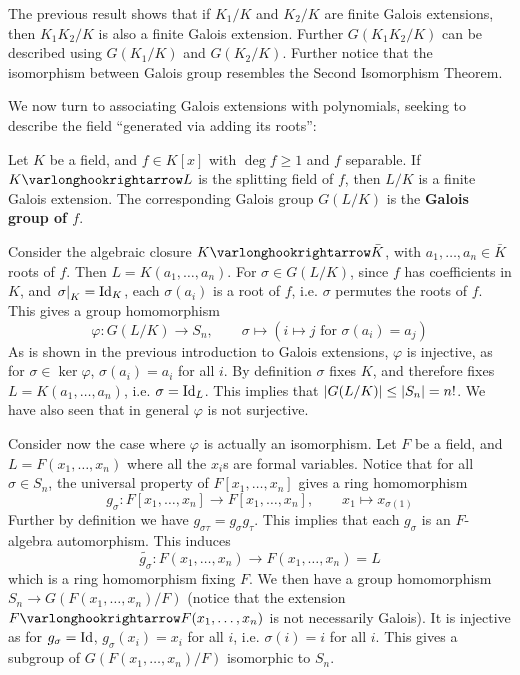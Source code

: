 \documentclass{article}
\begin{document}
\begin{remark}
    The previous result shows that if $K_1/K$ and $K_2/K$ are finite Galois extensions, then $K_1 K_2/K$ is also a finite Galois extension. Further $G(K_1 K_2/K)$ can be described using $G(K_1/K)$ and $G(K_2/K)$. Further notice that the isomorphism between Galois group resembles the Second Isomorphism Theorem.
\end{remark}

\textstart
We now turn to associating Galois extensions with polynomials, seeking to describe the field ``generated via adding its roots'':

\begin{definition}
    Let $K$ be a field, and $f \in K[x]$ with $\deg f \geq 1$ and $f$ separable. If $K \ext L$ is the splitting field of $f$, then $L/K$ is a finite Galois extension. The corresponding Galois group $G(L/K)$ is the \textbf{Galois group of $f$}.
\end{definition}

\textstart
\label{goto: order of galois group bounded by order of Sn}
Consider the algebraic closure $K \ext \bar{K}$, with $a_1, \dots, a_n \in \bar{K}$ roots of $f$. Then $L = K(a_1, \dots, a_n)$. For $\sigma \in G(L/K)$, since $f$ has coefficients in $K$, and $\left.\sigma\right|_{K} = \mathrm{Id}_K$, each $\sigma(a_i)$ is a root of $f$, i.e. $\sigma$ permutes the roots of $f$. This gives a group homomorphism
\[
    \varphi: G(L/K) \to S_n, \qquad \sigma \mapsto (i \mapsto j \text{ for $\sigma(a_i) = a_j$})
\]
As is shown in the previous introduction to Galois extensions, $\varphi$ is injective, as for $\sigma \in \ker \varphi$, $\sigma(a_i) = a_i$ for all $i$. By definition $\sigma$ fixes $K$, and therefore fixes $L = K(a_1, \dots, a_n)$, i.e. $\sigma = \mathrm{Id}_L$. This implies that $\left|G(L/K)\right| \leq \left|S_n\right| = n!$. We have also seen that in general $\varphi$ is not surjective.

Consider now the case where $\varphi$ is actually an isomorphism. Let $F$ be a field, and $L = F(x_1, \dots, x_n)$ where all the $x_i$s are formal variables. Notice that for all $\sigma \in S_n$, the universal property of $F[x_1, \dots, x_n]$ gives a ring homomorphism
\[
    g_{\sigma}: F[x_1, \dots, x_n] \to F[x_1, \dots, x_n], \qquad x_1 \mapsto x_{\sigma(1)}
\]
Further by definition we have $g_{\sigma\tau} = g_{\sigma} g_{\tau}$. This implies that each $g_{\sigma}$ is an $F$-algebra automorphism. This induces 
\[
    \widetilde{g_{\sigma}}: F(x_1, \dots, x_n) \to F(x_1, \dots, x_n) = L
\]
which is a ring homomorphism fixing $F$. We then have a group homomorphism $S_n \to G(F(x_1, \dots, x_n)/F)$ (notice that the extension $F \ext F(x_1, \dots, x_n)$ is not necessarily Galois). It is injective as for $g_{\sigma} = \mathrm{Id}$, $g_{\sigma}(x_i) = x_i$ for all $i$, i.e. $\sigma(i) = i$ for all $i$. This gives a subgroup of $G(F(x_1, \dots, x_n)/F)$ isomorphic to $S_n$.
\end{document}
